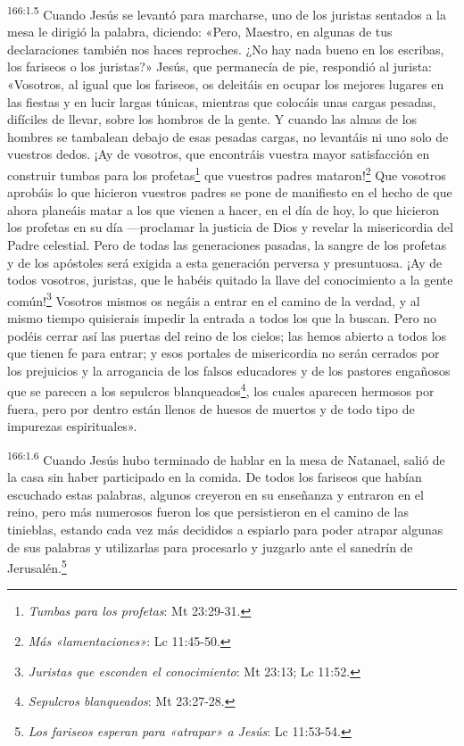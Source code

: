 \par
\textsuperscript{166:1.5} Cuando Jesús se levantó para marcharse, uno de los juristas sentados a la mesa le dirigió la palabra, diciendo: «Pero, Maestro, en algunas de tus declaraciones también nos haces reproches. ¿No hay nada bueno en los escribas, los fariseos o los juristas?» Jesús, que permanecía de pie, respondió al jurista: «Vosotros, al igual que los fariseos, os deleitáis en ocupar los mejores lugares en las fiestas y en lucir largas túnicas, mientras que colocáis unas cargas pesadas, difíciles de llevar, sobre los hombros de la gente. Y cuando las almas de los hombres se tambalean debajo de esas pesadas cargas, no levantáis ni uno solo de vuestros dedos. ¡Ay de vosotros, que encontráis vuestra mayor satisfacción en construir tumbas para los profetas\footnote{\textit{Tumbas para los profetas}: Mt 23:29-31.} que vuestros padres mataron!\footnote{\textit{Más «lamentaciones»}: Lc 11:45-50.} Que vosotros aprobáis lo que hicieron vuestros padres se pone de manifiesto en el hecho de que ahora planeáis matar a los que vienen a hacer, en el día de hoy, lo que hicieron los profetas en su día ---proclamar la justicia de Dios y revelar la misericordia del Padre celestial. Pero de todas las generaciones pasadas, la sangre de los profetas y de los apóstoles será exigida a esta generación perversa y presuntuosa. ¡Ay de todos vosotros, juristas, que le habéis quitado la llave del conocimiento a la gente común!\footnote{\textit{Juristas que esconden el conocimiento}: Mt 23:13; Lc 11:52.} Vosotros mismos os negáis a entrar en el camino de la verdad, y al mismo tiempo quisierais impedir la entrada a todos los que la buscan. Pero no podéis cerrar así las puertas del reino de los cielos; las hemos abierto a todos los que tienen fe para entrar; y esos portales de misericordia no serán cerrados por los prejuicios y la arrogancia de los falsos educadores y de los pastores engañosos que se parecen a los sepulcros blanqueados\footnote{\textit{Sepulcros blanqueados}: Mt 23:27-28.}, los cuales aparecen hermosos por fuera, pero por dentro están llenos de huesos de muertos y de todo tipo de impurezas espirituales».

\par
\textsuperscript{166:1.6} Cuando Jesús hubo terminado de hablar en la mesa de Natanael, salió de la casa sin haber participado en la comida. De todos los fariseos que habían escuchado estas palabras, algunos creyeron en su enseñanza y entraron en el reino, pero más numerosos fueron los que persistieron en el camino de las tinieblas, estando cada vez más decididos a espiarlo para poder atrapar algunas de sus palabras y utilizarlas para procesarlo y juzgarlo ante el sanedrín de Jerusalén.\footnote{\textit{Los fariseos esperan para «atrapar» a Jesús}: Lc 11:53-54.}

